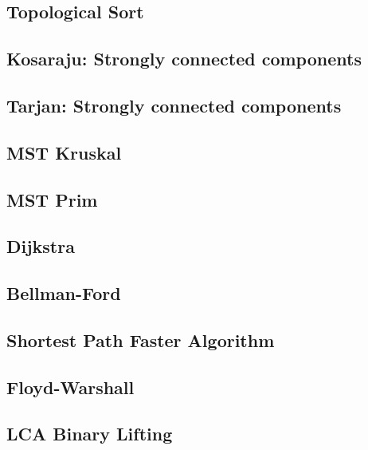 \subsection{Topological Sort}
\raggedbottom
\hrulefill
\subsection{Kosaraju: Strongly connected components}
\raggedbottom
\hrulefill
\subsection{Tarjan: Strongly connected components}
\raggedbottom
\hrulefill
\subsection{MST Kruskal}
\raggedbottom
\hrulefill
\subsection{MST Prim}
\raggedbottom
\hrulefill
\subsection{Dijkstra}
\raggedbottom
\hrulefill
\subsection{Bellman-Ford}
\raggedbottom
\hrulefill
\subsection{Shortest Path Faster Algorithm}
\raggedbottom
\hrulefill
\subsection{Floyd-Warshall}
\raggedbottom
\hrulefill
\subsection{LCA Binary Lifting}
\raggedbottom
\hrulefill
